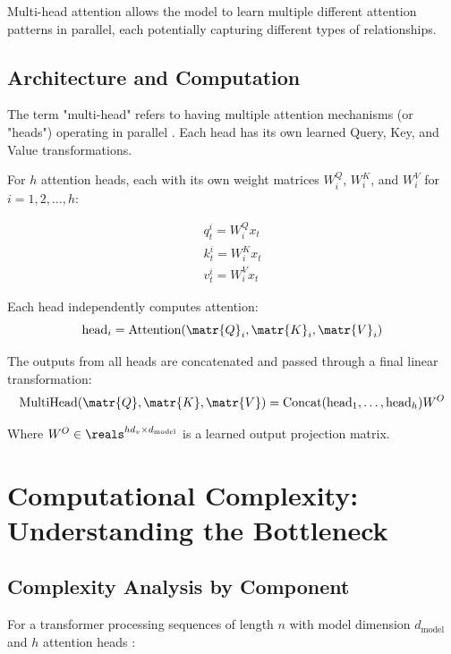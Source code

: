 Multi-head attention allows the model to learn multiple different attention patterns in parallel, each potentially capturing different types of relationships.

\subsection{Architecture and Computation}

The term "multi-head" refers to having multiple attention mechanisms (or "heads") operating in parallel \cite{vaswani2017attention}. Each head has its own learned Query, Key, and Value transformations.

For $h$ attention heads, each with its own weight matrices $W_i^Q$, $W_i^K$, and $W_i^V$ for $i = 1, 2, \ldots, h$:

\begin{gather*}
  q_t^i = W_i^Q x_t\\
  k_t^i = W_i^K x_t\\
  v_t^i = W_i^V x_t
\end{gather*}

Each head independently computes attention:
\[
  \text{head}_i = \text{Attention}(\matr{Q}_i, \matr{K}_i, \matr{V}_i)
\]

The outputs from all heads are concatenated and passed through a final linear transformation:
\[
  \text{MultiHead}(\matr{Q}, \matr{K}, \matr{V}) = \text{Concat}(\text{head}_1, \ldots, \text{head}_h) W^O
\]

Where $W^O \in \reals^{hd_v \times d_{\text{model}}}$ is a learned output projection matrix.



\section{Computational Complexity: Understanding the Bottleneck}

\subsection{Complexity Analysis by Component}

For a transformer processing sequences of length $n$ with model dimension $d_{\text{model}}$ and $h$ attention heads \cite{Akrout2024}:

